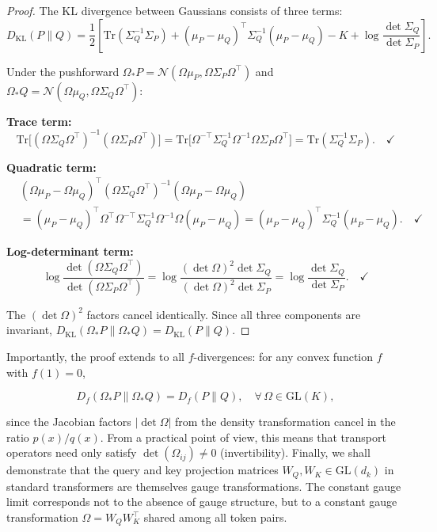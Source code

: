\documentclass[twoside,11pt]{article}
\begin{document}
\begin{proof}
The KL divergence between Gaussians consists of three terms:
\begin{equation}
D_{\mathrm{KL}}(P \| Q) = \frac{1}{2}\left[\mathrm{Tr}(\Sigma_Q^{-1}\Sigma_P) + (\mu_P - \mu_Q)^\top \Sigma_Q^{-1}(\mu_P - \mu_Q) - K + \log\frac{\det\Sigma_Q}{\det\Sigma_P}\right].
\end{equation}

Under the pushforward $\Omega_* P = \mathcal{N}(\Omega\mu_P, \Omega\Sigma_P\Omega^\top)$ and $\Omega_* Q = \mathcal{N}(\Omega\mu_Q, \Omega\Sigma_Q\Omega^\top)$:

\textbf{Trace term:}
\begin{equation}
\mathrm{Tr}\big[(\Omega\Sigma_Q\Omega^\top)^{-1}(\Omega\Sigma_P\Omega^\top)\big] = \mathrm{Tr}\big[\Omega^{-\top}\Sigma_Q^{-1}\Omega^{-1}\Omega\Sigma_P\Omega^\top\big] = \mathrm{Tr}(\Sigma_Q^{-1}\Sigma_P). \quad \checkmark
\end{equation}

\textbf{Quadratic term:}
\begin{align}
&(\Omega\mu_P - \Omega\mu_Q)^\top (\Omega\Sigma_Q\Omega^\top)^{-1} (\Omega\mu_P - \Omega\mu_Q) \nonumber\\
&= (\mu_P - \mu_Q)^\top \Omega^\top \Omega^{-\top}\Sigma_Q^{-1}\Omega^{-1}\Omega (\mu_P - \mu_Q) = (\mu_P - \mu_Q)^\top \Sigma_Q^{-1}(\mu_P - \mu_Q). \quad \checkmark
\end{align}

\textbf{Log-determinant term:}
\begin{equation}
\log\frac{\det(\Omega\Sigma_Q\Omega^\top)}{\det(\Omega\Sigma_P\Omega^\top)} = \log\frac{(\det\Omega)^2 \det\Sigma_Q}{(\det\Omega)^2 \det\Sigma_P} = \log\frac{\det\Sigma_Q}{\det\Sigma_P}. \quad \checkmark
\end{equation}

The $(\det\Omega)^2$ factors cancel identically. Since all three components are invariant, $D_{\mathrm{KL}}(\Omega_* P \| \Omega_* Q) = D_{\mathrm{KL}}(P \| Q)$.
\end{proof}

Importantly, the proof extends to all $f$-divergences: for any convex function $f$ with $f(1) = 0$,

\begin{equation}
D_f(\Omega_* P \| \Omega_* Q) = D_f(P \| Q), \quad \forall\, \Omega \in \mathrm{GL}(K),
\end{equation}

since the Jacobian factors $|\det\Omega|$ from the density transformation cancel in the ratio $p(x)/q(x)$. From a practical point of view, this means that transport operators need only satisfy $\det(\Omega_{ij}) \neq 0$ (invertibility). Finally, we shall demonstrate that the query and key projection matrices $W_Q, W_K \in \mathrm{GL}(d_k)$ in standard transformers are themselves gauge transformations. The constant gauge limit corresponds not to the absence of gauge structure, but to a constant gauge transformation $\Omega = W_Q W_K^\top$ shared among all token pairs.
\end{document}
